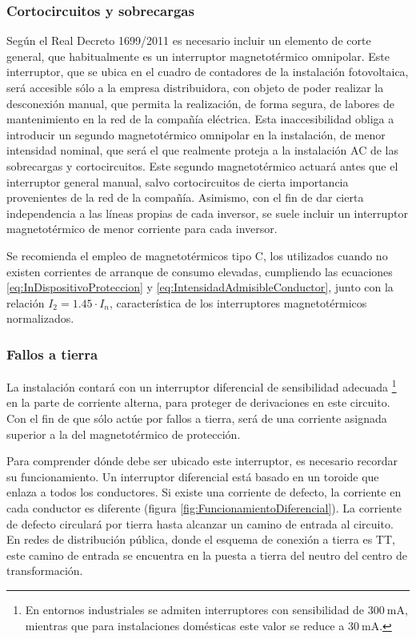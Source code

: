 \subsubsection{Cortocircuitos y sobrecargas}

Según el Real Decreto 1699/2011\cite{RealDecreto2011} es necesario
incluir un elemento de corte general, que habitualmente es un
interruptor magnetotérmico omnipolar. Este interruptor, que se ubica
en el cuadro de contadores de la instalación fotovoltaica, será
accesible sólo a la empresa distribuidora, con objeto de poder
realizar la desconexión manual, que permita la realización, de forma
segura, de labores de mantenimiento en la red de la compañía
eléctrica. Esta inaccesibilidad obliga a introducir un segundo
magnetotérmico omnipolar en la instalación, de menor intensidad
nominal, que será el que realmente proteja a la instalación AC de las
sobrecargas y cortocircuitos. Este segundo magnetotérmico actuará
antes que el interruptor general manual, salvo cortocircuitos de
cierta importancia provenientes de la red de la compañía. Asimismo,
con el fin de dar cierta independencia a las líneas propias de cada
inversor, se suele incluir un interruptor magnetotérmico de menor
corriente para cada inversor.

Se recomienda el empleo de magnetotérmicos tipo C, los utilizados
cuando no existen corrientes de arranque de consumo elevadas, cumpliendo
las ecuaciones \ref{eq:InDispositivoProteccion} y \ref{eq:IntensidadAdmisibleConductor},
junto con la relación $I_{2}=1.45\cdot I_{n}$, característica de
los interruptores magnetotérmicos normalizados.


\subsubsection{Fallos a tierra }

La instalación contará con un interruptor diferencial de sensibilidad
adecuada%
\footnote{En entornos industriales se admiten interruptores con sensibilidad
de $\SI{300}{\milli\ampere}$, mientras que para instalaciones domésticas
este valor se reduce a $\SI{30}{\milli\ampere}$.%
} en la parte de corriente alterna, para proteger de derivaciones en
este circuito. Con el fin de que sólo actúe por fallos a tierra, será
de una corriente asignada superior a la del magnetotérmico de protección. 

Para comprender dónde debe ser ubicado este interruptor, es necesario
recordar su funcionamiento. Un interruptor diferencial está basado en
un toroide que enlaza a todos los conductores. Si existe una corriente
de defecto, la corriente en cada conductor es diferente (figura
\ref{fig:FuncionamientoDiferencial}).  La corriente de defecto
circulará por tierra hasta alcanzar un camino de entrada al
circuito. En redes de distribución pública, donde el esquema de
conexión a tierra es TT, este camino de entrada se encuentra en la
puesta a tierra del neutro del centro de transformación. 

